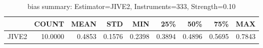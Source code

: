 \begin{table}[ht]
\centering
\caption{bias summary: Estimator=JIVE2, Instruments=333, Strength=0.10}
\begin{tabular}{lrrrrrrrr}
\toprule
 & COUNT & MEAN & STD & MIN & 25\% & 50\% & 75\% & MAX \\
\midrule
JIVE2 & 10.0000 & 0.4853 & 0.1576 & 0.2398 & 0.3894 & 0.4896 & 0.5695 & 0.7843 \\
\bottomrule
\end{tabular}
\end{table}
